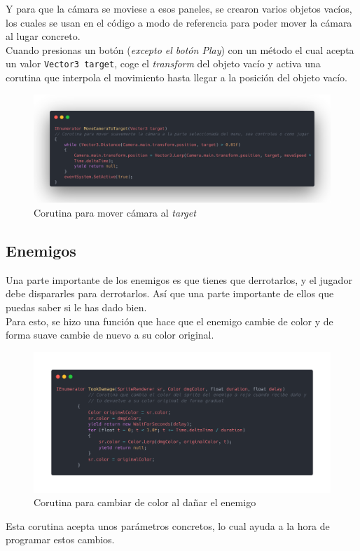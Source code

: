 \documentclass[12pt]{article}
\begin{document}
        Y para que la cámara se moviese a esos paneles, se crearon varios objetos vacíos, los cuales se usan en el código a modo de referencia para poder mover la cámara al lugar concreto. \\
        Cuando presionas un botón (\textit{excepto el botón Play}) con un método el cual acepta un valor \texttt{Vector3 target}, coge el \textit{transform} del objeto vacío y activa una corutina que interpola el movimiento hasta llegar a la posición del objeto vacío. \\
        \begin{figure}[H]
            \centering
            \includegraphics[width=\textwidth]{Images/Menuprincipal/corutinacamara.png}
            \caption{Corutina para mover cámara al \textit{target}}
        \end{figure}

    \subsection{Enemigos}
        Una parte importante de los enemigos es que tienes que derrotarlos, y el jugador debe dispararles para derrotarlos. Así que una parte importante de ellos que puedas saber si le has dado bien. \\
        Para esto, se hizo una función que hace que el enemigo cambie de color y de forma suave cambie de nuevo a su color original. \\
        \begin{figure}[H]
            \centering
            \includegraphics[width=\textwidth]{Images/Menuprincipal/TookDamage.png}
            \caption{Corutina para cambiar de color al dañar el enemigo}
        \end{figure}
        Esta corutina acepta unos parámetros concretos, lo cual ayuda a la hora de programar estos cambios.\\
\end{document}

